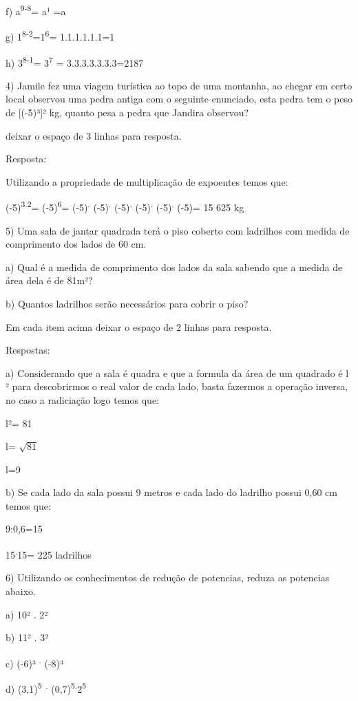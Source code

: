 f) a\textsuperscript{9-8}= a¹ =a

g) 1\textsuperscript{8-2}=1\textsuperscript{6}= 1.1.1.1.1.1=1

h) 3\textsuperscript{8-1}= 3\textsuperscript{7} = 3.3.3.3.3.3.3=2187

4) Jamile fez uma viagem turística ao topo de uma montanha, ao chegar em
certo local observou uma pedra antiga com o seguinte enunciado, esta
pedra tem o peso de {[}(-5)³{]}² kg, quanto pesa a pedra que Jandira
observou?

deixar o espaço de 3 linhas para resposta.

Resposta:

Utilizando a propriedade de multiplicação de expoentes temos que:

(-5)\textsuperscript{3.2}= (-5)\textsuperscript{6}=
(-5)\textsuperscript{.} (-5)\textsuperscript{.} (-5)\textsuperscript{.}
(-5)\textsuperscript{.} (-5)\textsuperscript{.} (-5)= 15 625 kg

5) Uma sala de jantar quadrada terá o piso coberto com ladrilhos com
medida de comprimento dos lados de 60 cm.

a) Qual é a medida de comprimento dos lados da sala sabendo que a medida
de área dela é de 81m²?

b) Quantos ladrilhos serão necessários para cobrir o piso?

Em cada item acima deixar o espaço de 2 linhas para resposta.

Respostas:

a) Considerando que a sala é quadra e que a formula da área de um
quadrado é l ² para descobrirmos o real valor de cada lado, basta
fazermos a operação inversa, no caso a radiciação logo temos que:

l²= 81

l= \(\sqrt{81}\)

l=9

b) Se cada lado da sala possui 9 metros e cada lado do ladrilho possui
0,60 cm temos que:

9:0,6=15

15\textsuperscript{.}15= 225 ladrilhos

6) Utilizando os conhecimentos de redução de potencias, reduza as
potencias abaixo.

a) 10² . 2²

b) 11² . 3²

c) (-6)³ \textsuperscript{.} (-8)³

d) (3,1)\textsuperscript{5~.}
(0,7)\textsuperscript{5.}2\textsuperscript{5}

